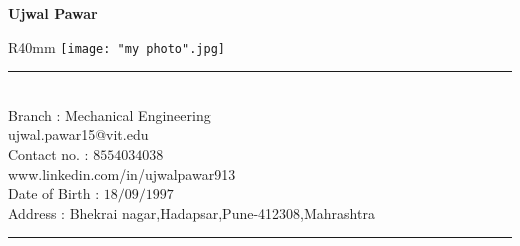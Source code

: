 \documentclass[11pt]{article}
\begin{document}
	\begin{center}
		\begin{huge}
			\textbf{Ujwal Pawar}\\
		\end{huge}
	\end{center}

	\bigskip 	
	\begin{wrapfigure}{R}{40mm}
		\centering
		\texttt{[image: "my photo".jpg]}
	\end{wrapfigure}
	
	\noindent\rule{6.5in}{0.4pt}\\
	Branch : Mechanical Engineering\\
	ujwal.pawar15@vit.edu\\
	Contact no. : $8554034038$ \\      
	www.linkedin.com/in/ujwalpawar913\\
	Date of Birth : $18/09/1997$ \\
	Address : Bhekrai nagar,Hadapsar,Pune-412308,Mahrashtra\\
	\noindent\rule{6.5in}{0.4pt}\\
	
\end{document}
